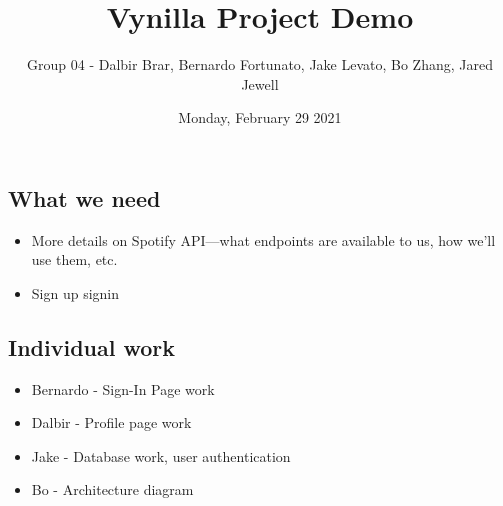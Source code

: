 \documentclass[12pt]{article}
\begin{document}
    \title{Vynilla Project Demo}
    \author{Group 04 - Dalbir Brar, Bernardo Fortunato, Jake Levato, Bo Zhang, Jared Jewell}
    \date{Monday, February 29 2021}
    \maketitle
    
\subsection*{What we need}

\vspace{-2mm}
\begin{itemize} \setlength\itemsep{-0.2em}
    \item More details on Spotify API—what endpoints are available to us, how we'll use them, etc.
    \item Sign up signin
\end{itemize}
\subsection*{Individual work}

\vspace{-2mm}
\begin{itemize} \setlength\itemsep{-0.2em}
 
    \item Bernardo - Sign-In Page work
    \item Dalbir   - Profile page work
    \item Jake     - Database work, user authentication
    \item Bo       - Architecture diagram
\end{itemize}
\end{document}
